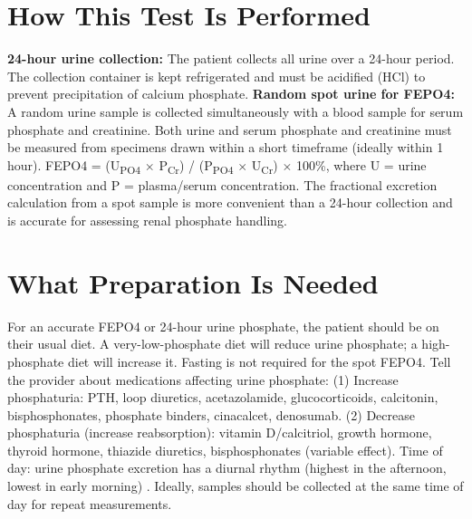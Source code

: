 \section*{How This Test Is Performed}
\textbf{24-hour urine collection:} The patient collects all urine over a 24-hour period. The collection container is kept refrigerated and must be acidified (HCl) to prevent precipitation of calcium phosphate. \textbf{Random spot urine for FEPO4:} A random urine sample is collected simultaneously with a blood sample for serum phosphate and creatinine. Both urine and serum phosphate and creatinine must be measured from specimens drawn within a short timeframe (ideally within 1 hour). FEPO4 = (U\textsubscript{PO4} $\times$ P\textsubscript{Cr}) / (P\textsubscript{PO4} $\times$ U\textsubscript{Cr}) $\times$ 100\%, where U = urine concentration and P = plasma/serum concentration. The fractional excretion calculation from a spot sample is more convenient than a 24-hour collection and is accurate for assessing renal phosphate handling.

\section*{What Preparation Is Needed}
For an accurate FEPO4 or 24-hour urine phosphate, the patient should be on their usual diet. A very-low-phosphate diet will reduce urine phosphate; a high-phosphate diet will increase it. Fasting is not required for the spot FEPO4. Tell the provider about medications affecting urine phosphate: (1) Increase phosphaturia: PTH, loop diuretics, acetazolamide, glucocorticoids, calcitonin, bisphosphonates, phosphate binders, cinacalcet, denosumab. (2) Decrease phosphaturia (increase reabsorption): vitamin D/calcitriol, growth hormone, thyroid hormone, thiazide diuretics, bisphosphonates (variable effect). Time of day: urine phosphate excretion has a diurnal rhythm (highest in the afternoon, lowest in early morning) \cite{portale1987dietary}. Ideally, samples should be collected at the same time of day for repeat measurements.


